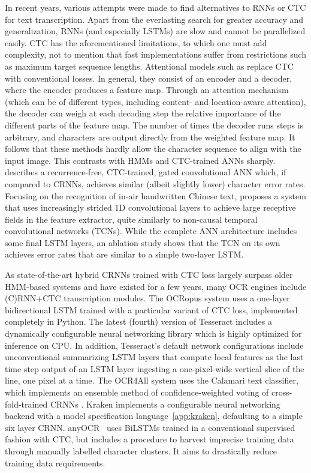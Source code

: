 In recent years, various attempts were made to find alternatives to RNNs or CTC
for text transcription. Apart from the everlasting search for greater accuracy
and generalization, RNNs (and especially LSTMs) are slow and cannot be
parallelized easily. CTC has the aforementioned limitations, to which one must
add complexity, not to mention that fast implementations suffer from
restrictions such as maximum target sequence lengths. Attentional models such
as \cite{sueiras2018offline,michael2019evaluating,kang2018convolve} replace CTC
with conventional losses. In general, they consist of an encoder and a decoder,
where the encoder produces a feature map.  Through an attention mechanism
(which can be of different types, including content- and location-aware
attention), the decoder can weigh at each decoding step the relative importance
of the different parts of the feature map. The number of times the decoder runs
steps is arbitrary, and characters are output directly from the weighted feature map. It
follows that these methods hardly allow the character sequence to align with
the input image. This contrasts with HMMs and CTC-trained ANNs sharply.
\cite{coquenet2020recurrence} describes a recurrence-free, CTC-trained, gated
convolutional ANN which, if compared to CRNNs, achieves similar (albeit
slightly lower) character error rates. Focusing on the recognition of in-air
handwritten Chinese text, \cite{gan2020air} proposes a system that uses
increasingly strided 1D convolutional layers to achieve large receptive fields
in the feature extractor, quite similarly to non-causal temporal convolutional
networks (TCNs). While the complete ANN architecture includes some final LSTM
layers, an ablation study shows that the TCN on its own achieves error rates
that are similar to a simple two-layer LSTM.

As state-of-the-art hybrid CRNNs trained with CTC loss largely surpass older
HMM-based systems and have existed for a few years, many OCR engines include
(C)RNN+CTC transcription modules. The OCRopus system uses a one-layer
bidirectional LSTM trained with a particular variant of CTC loss, implemented
completely in Python. The latest (fourth) version of Tesseract includes a
dynamically configurable neural networking library which is highly optimized
for inference on CPU. In addition, Tesseract’s default network configurations
include unconventional summarizing LSTM layers that compute local features as
the last time step output of an LSTM layer ingesting a one-pixel-wide vertical
slice of the line, one pixel at a time. The OCR4All system uses the Calamari
text classifier, which implements an ensemble method of confidence-weighted
voting of cross-fold-trained CRNNs \cite{wick2018calamari}. Kraken implements a
configurable neural networking backend with a model specification
language~\ref{app:kraken}, defaulting to a simple six layer CRNN.
anyOCR~\cite{bukhari2017anyocr} uses BiLSTMs trained in a conventional
supervised fashion with CTC, but includes a procedure to harvest imprecise
training data through manually labelled character clusters. It aims to
drastically reduce training data requirements.

